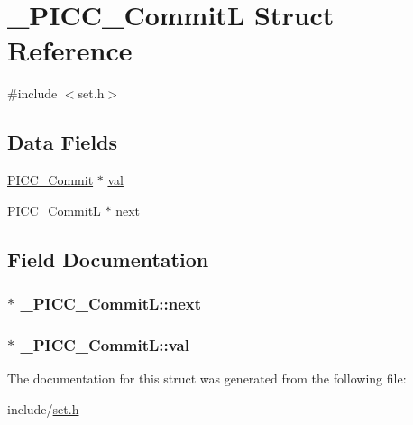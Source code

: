 \hypertarget{struct__PICC__CommitL}{\section{\-\_\-\-P\-I\-C\-C\-\_\-\-Commit\-L Struct Reference}
\label{struct__PICC__CommitL}
}


{\ttfamily \#include $<$set.\-h$>$}

\subsection*{Data Fields}
\begin{DoxyCompactItemize}
\item 
\hyperlink{commit_8h_a655097bbaf0e81713b6d9336948c211c}{P\-I\-C\-C\-\_\-\-Commit} $\ast$ \hyperlink{struct__PICC__CommitL_a6d745adc9903509cca29948867f70b5f}{val}
\item 
\hyperlink{set_8h_a4e156f04e6c171d7c62eef3f6aa0e9e1}{P\-I\-C\-C\-\_\-\-Commit\-L} $\ast$ \hyperlink{struct__PICC__CommitL_a7308bd970ee3d36d6196f747bb8d717b}{next}
\end{DoxyCompactItemize}


\subsection{Field Documentation}
\hypertarget{struct__PICC__CommitL_a7308bd970ee3d36d6196f747bb8d717b}{
\subsubsection[{next}]{$\ast$ \-\_\-\-P\-I\-C\-C\-\_\-\-Commit\-L\-::next}}\label{struct__PICC__CommitL_a7308bd970ee3d36d6196f747bb8d717b}
\hypertarget{struct__PICC__CommitL_a6d745adc9903509cca29948867f70b5f}{
\subsubsection[{val}]{$\ast$ \-\_\-\-P\-I\-C\-C\-\_\-\-Commit\-L\-::val}}\label{struct__PICC__CommitL_a6d745adc9903509cca29948867f70b5f}


The documentation for this struct was generated from the following file\-:\begin{DoxyCompactItemize}
\item 
include/\hyperlink{set_8h}{set.\-h}\end{DoxyCompactItemize}
